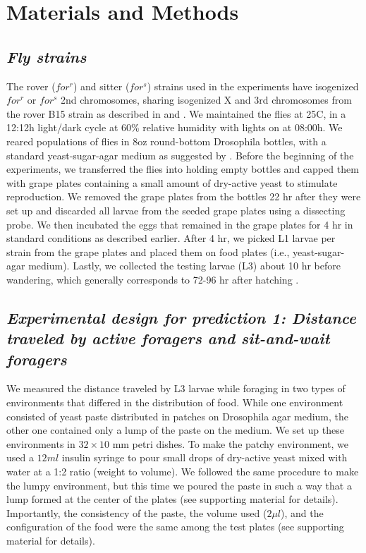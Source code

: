 \documentclass[12pt]{article}
\begin{document}
\vspace{20px}

\section*{\normalsize Materials and Methods}%

\subsection*{\normalsize \textit{Fly strains}}

The rover ($for^r$) and sitter ($for^s$) strains used in the experiments have isogenized $for^r$ or $for^s$ 2nd chromosomes, sharing isogenized X and 3rd chromosomes from the rover B15 strain as described in \cite{bauer1985genetic} and \cite{sokolowski1980foraging}. We maintained the flies at 25\textdegree C, in a 12:12h light/dark cycle at 60\% relative humidity with lights on at 08:00h. We reared populations of flies in 8oz round-bottom Drosophila bottles, with a standard yeast-sugar-agar medium as suggested by \cite{anreiter2016foraging}. Before the beginning of the experiments, we transferred the flies into holding empty bottles and capped them with grape plates containing a small amount of dry-active yeast to stimulate reproduction. We removed the grape plates from the bottles 22 hr after they were set up and discarded all larvae from the seeded grape plates using a dissecting probe. We then incubated the eggs that remained in the grape plates for 4 hr in standard conditions as described earlier. After 4 hr, we picked L1 larvae per strain from the grape plates and placed them on food plates (i.e., yeast-sugar-agar medium). Lastly, we collected the testing larvae (L3) about 10 hr before wandering, which generally corresponds to 72-96 hr after hatching \citep{anreiter2016foraging}.

\vspace{20px}

\subsection*{\normalsize \textit{Experimental design for prediction 1: Distance traveled by active foragers and sit-and-wait foragers}}

We measured the distance traveled by L3 larvae while foraging in two types of environments that differed in the distribution of food. While one environment consisted of yeast paste distributed in patches on Drosophila agar medium, the other one contained only a lump of the paste on the medium. We set up these environments in $32 \times 10$ mm petri dishes. To make the patchy environment, we used a $12ml$ insulin syringe to pour small drops of dry-active yeast mixed with water at a 1:2 ratio (weight to volume). We followed the same procedure to make the lumpy environment, but this time we poured the paste in such a way that a lump formed at the center of the plates (see supporting material for details). Importantly, the consistency of the paste, the volume used ($2\mu l$), and the configuration of the food were the same among the test plates (see supporting material for details). 
\end{document}
